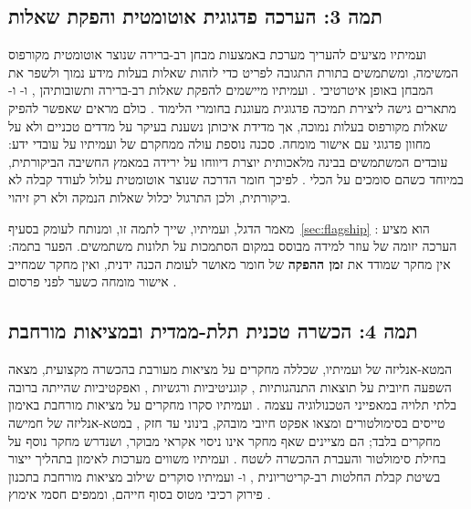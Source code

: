 \subsection{תמה 3: הערכה פדגוגית אוטומטית והפקת שאלות}
 ועמיתיו מציעים להעריך מערכת  באמצעות מבחן רב-ברירה שנוצר אוטומטית מקורפוס המשימה, ומשתמשים בתורת
התגובה לפריט  כדי לזהות שאלות בעלות מידע נמוך ולשפר את המבחן באופן איטרטיבי \cite{guinet2024exam}. 
ועמיתיו מיישמים  להפקת שאלות רב-ברירה ותשובותיהן \cite{pradeesh2025mcq}, ו- ו-
מתארים גישה ליצירת תמיכה פדגוגית מעוגנת בחומרי הלימוד \cite{ramkumar2026pedagogical}. כולם מראים שאפשר להפיק שאלות
מקורפוס בעלות נמוכה, אך מדידת איכותן נשענת בעיקר על מדדים טכניים ולא על מחוון פדגוגי עם אישור מומחה. סכנה נוספת עולה
ממחקרם של  ועמיתיו על עובדי ידע: עובדים המשתמשים בבינה מלאכותית יוצרת דיווחו על ירידה במאמץ החשיבה הביקורתית,
במיוחד כשהם סומכים על הכלי \cite{lee2025impact}. לפיכך חומר הדרכה שנוצר אוטומטית עלול לעודד קבלה לא ביקורתית, ולכן התרגול
יכלול שאלות הנמקה ולא רק זיהוי.

מאמר הדגל,  ועמיתיו, שייך לתמה זו, ומנותח לעומק בסעיף~\ref{sec:flagship} \cite{hua2025civask}: הוא מציע הערכה יזומה של
עוזר למידה מבוסס  במקום הסתמכות על תלונות משתמשים. הפער בתמה: אין מחקר שמודד את \textbf{זמן ההפקה} של חומר
מאושר לעומת הכנה ידנית, ואין מחקר שמחייב אישור מומחה כשער לפני פרסום .

\subsection{תמה 4: הכשרה טכנית \mbox{תלת-ממדית} ובמציאות מורחבת}
המטא-אנליזה של  ועמיתיו, שכללה  מחקרים על מציאות מעורבת בהכשרה מקצועית, מצאה השפעה חיובית
על תוצאות התנהגותיות , קוגניטיביות  ורגשיות , ואפקטיביות שהייתה ברובה
בלתי תלויה במאפייני הטכנולוגיה עצמה \cite{bodding2025mr}.  ועמיתיו סקרו  מחקרים על מציאות
מורחבת באימון טייסים בסימולטורים ומצאו אפקט חיובי מובהק, בינוני עד חזק , במטא-אנליזה של חמישה מחקרים בלבד; הם מציינים
שאף מחקר אינו ניסוי אקראי מבוקר, ושנדרש מחקר נוסף על בחילת סימולטור והעברת ההכשרה לשטח \cite{somerville2025xr}.
 ועמיתיו משווים מערכות  לאימון בתהליך ייצור בשיטת קבלת החלטות רב-קריטריונית
\cite{jalilvand2024xr}, ו- ועמיתיו סוקרים שילוב מציאות מורחבת בתכנון פירוק רכיבי מטוס בסוף חייהם, וממפים חסמי
אימוץ \cite{yang2023xr}.

